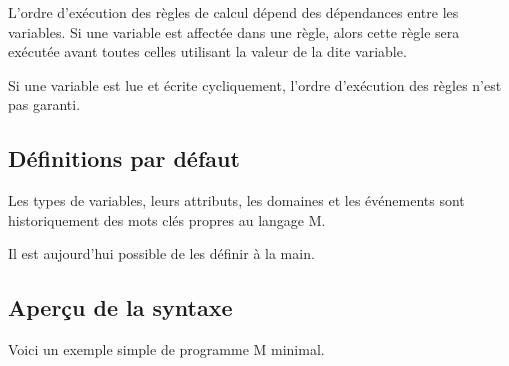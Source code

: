 \documentclass[letterpaper,10pt,french]{sphinxmanual}
\begin{document}
\sphinxAtStartPar
L’ordre d’exécution des règles de calcul dépend des dépendances entre les
variables. Si une variable est affectée dans une règle, alors cette règle
sera exécutée avant toutes celles utilisant la valeur de la dite variable.

\sphinxAtStartPar
Si une variable est lue et écrite cycliquement, l’ordre d’exécution des règles
n’est pas garanti.


\subsection{Définitions par défaut}
\label{\detokenize{intro:definitions-par-defaut}}
\sphinxAtStartPar
Les types de variables, leurs attributs, les domaines et les événements
sont historiquement des mots clés propres au langage M.

\sphinxAtStartPar
Il est aujourd’hui possible de les définir à la main.


\subsection{Aperçu de la syntaxe}
\label{\detokenize{intro:apercu-de-la-syntaxe}}
\sphinxAtStartPar
Voici un exemple simple de programme M minimal.

\begin{sphinxVerbatim}[commandchars=\\\{\}]

   

    
   

 

 
  
 
\end{sphinxVerbatim}
\end{document}
